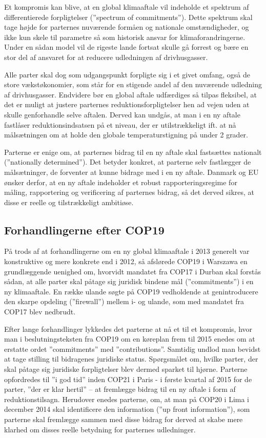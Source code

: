 Et kompromis kan blive, at en global klimaaftale vil indeholde et spektrum af differentierede forpligtelser (”spectrum of commitments”). Dette spektrum skal tage højde for parternes nuværende formåen og nationale omstændigheder, og ikke kun skele til parametre så som historisk ansvar for klimaforandringerne. Under en sådan model vil de rigeste lande fortsat skulle gå forrest og bære en stor del af ansvaret for at reducere udledningen af drivhusgasser.

Alle parter skal dog som udgangspunkt forpligte sig i et givet omfang, også de store vækstøkonomier, som står for en stigende andel af den nuværende udledning af drivhusgasser. Endvidere bør en global aftale udfærdiges så tilpas fleksibel, at det er muligt at justere parternes reduktionsforpligtelser hen ad vejen uden at skulle genforhandle selve aftalen. Derved kan undgås, at man i en ny aftale fastlåser reduktionsindsatsen på et niveau, der er utilstrækkeligt ift. at nå målsætningen om at holde den globale temperaturstigning på under 2 grader.

Parterne er enige om, at parternes bidrag til en ny aftale skal fastsættes nationalt (”nationally determined”). Det betyder konkret, at parterne selv fastlægger de målsætninger, de forventer at kunne bidrage med i en ny aftale. Danmark og EU ønsker derfor, at en ny aftale indeholder et robust rapporteringsregime for måling, rapportering og verificering af parternes bidrag, så det derved sikres, at disse er reelle og tilstrækkeligt ambitiøse.

\subsection{Forhandlingerne efter COP19}

På trods af at forhandlingerne om en ny global klimaaftale i 2013 generelt var konstruktive og mere konkrete end i 2012, så afslørede COP19 i Warszawa en grundlæggende uenighed om, hvorvidt mandatet fra COP17 i Durban skal forstås sådan, at alle parter skal påtage sig juridisk bindene mål (”commitments”) i en ny klimaaftale. En række ulande søgte på COP19 vedholdende at genintroducere den skarpe opdeling (”firewall”) mellem i- og ulande, som med mandatet fra COP17 blev nedbrudt.

Efter lange forhandlinger lykkedes det parterne at nå et til et kompromis, hvor man i beslutningsteksten fra COP19 om en køreplan frem til 2015 enedes om at erstatte ordet ”commitments” med ”contributions”. Samtidig undlod man bevidst at tage stilling til bidragenes juridiske status. Spørgsmålet om, hvilke parter, der skal påtage sig juridiske forpligtelser blev dermed sparket til hjørne. Parterne opfordredes til ”i god tid” inden COP21 i Paris - i første kvartal af 2015 for de parter, ”der er klar hertil” – at fremlægge bidrag til en ny aftale i form af reduktionstilsagn. Herudover enedes parterne, om, at man på COP20 i Lima i december 2014 skal identificere den information (”up front information”), som parterne skal fremlægge sammen med disse bidrag for derved at skabe mere klarhed om disses reelle betydning for parternes udledninger.